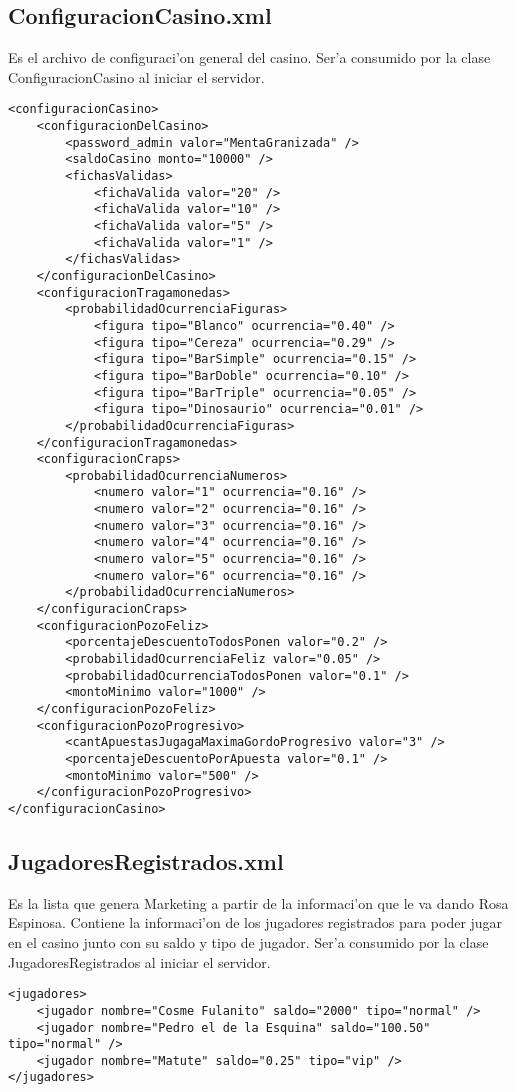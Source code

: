 \subsection{ConfiguracionCasino.xml}
Es el archivo de configuraci'on general del casino. Ser'a consumido por la clase ConfiguracionCasino al iniciar el servidor.

\begin{verbatim}
<configuracionCasino>
    <configuracionDelCasino>
        <password_admin valor="MentaGranizada" />
        <saldoCasino monto="10000" />
        <fichasValidas>
            <fichaValida valor="20" />
            <fichaValida valor="10" />
            <fichaValida valor="5" />
            <fichaValida valor="1" />
        </fichasValidas>
    </configuracionDelCasino>
    <configuracionTragamonedas>
        <probabilidadOcurrenciaFiguras>
            <figura tipo="Blanco" ocurrencia="0.40" />
            <figura tipo="Cereza" ocurrencia="0.29" />
            <figura tipo="BarSimple" ocurrencia="0.15" />
            <figura tipo="BarDoble" ocurrencia="0.10" />
            <figura tipo="BarTriple" ocurrencia="0.05" />
            <figura tipo="Dinosaurio" ocurrencia="0.01" />
        </probabilidadOcurrenciaFiguras>
    </configuracionTragamonedas>
    <configuracionCraps>
        <probabilidadOcurrenciaNumeros>
            <numero valor="1" ocurrencia="0.16" />
            <numero valor="2" ocurrencia="0.16" />
            <numero valor="3" ocurrencia="0.16" />
            <numero valor="4" ocurrencia="0.16" />
            <numero valor="5" ocurrencia="0.16" />
            <numero valor="6" ocurrencia="0.16" />
        </probabilidadOcurrenciaNumeros>
    </configuracionCraps>
    <configuracionPozoFeliz>
        <porcentajeDescuentoTodosPonen valor="0.2" />
        <probabilidadOcurrenciaFeliz valor="0.05" />
        <probabilidadOcurrenciaTodosPonen valor="0.1" />
        <montoMinimo valor="1000" />
    </configuracionPozoFeliz>
    <configuracionPozoProgresivo>
        <cantApuestasJugagaMaximaGordoProgresivo valor="3" />
        <porcentajeDescuentoPorApuesta valor="0.1" />
        <montoMinimo valor="500" />
    </configuracionPozoProgresivo>
</configuracionCasino>

\end{verbatim}

\subsection{JugadoresRegistrados.xml}
Es la lista que genera Marketing a partir de la informaci'on que le va dando Rosa Espinosa. Contiene la informaci'on de los jugadores registrados para poder jugar en el casino junto con su saldo y tipo de jugador. Ser'a consumido por la clase JugadoresRegistrados al iniciar el servidor.

\begin{verbatim}
<jugadores>
    <jugador nombre="Cosme Fulanito" saldo="2000" tipo="normal" />
    <jugador nombre="Pedro el de la Esquina" saldo="100.50" tipo="normal" />
    <jugador nombre="Matute" saldo="0.25" tipo="vip" />
</jugadores>
\end{verbatim}
